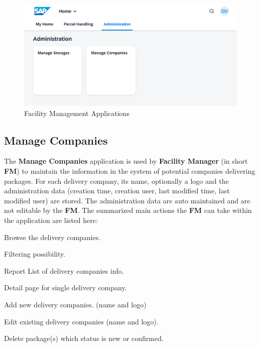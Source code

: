 \begin{figure}[H]
	\centering
	\includegraphics[width=1\linewidth]{images/user_doc/overviews/AdminTab.png}
	\caption{Facility Management Applications}
	\label{fig:ManagerApplications}
\end{figure}


\subsection{Manage Companies}
\label{subsec:mc}

The \textbf{Manage Companies} application is used by \textbf{Facility Manager} (in short \textbf{FM}) to maintain the information in the system of potential companies delivering packages. For each delivery company, its name, optionally a logo and the administration data (creation time, creation user, last modified time, last modified user) are stored. The administration data are auto maintained and are not editable by the \textbf{FM}. The summarized main actions the \textbf{FM} can take within the application are listed here:

\begin{compactenum}
	\item Browse the delivery companies.
        \begin{compactenum}
            \item Filtering possibility.
            \item Report List of delivery companies info.
            \item Detail page for single delivery company.
        \end{compactenum}
    \item Add new delivery companies. (name and logo)
    \item Edit existing delivery companies (name and logo).
    \item Delete package(s) which status is new or confirmed.
\end{compactenum}

